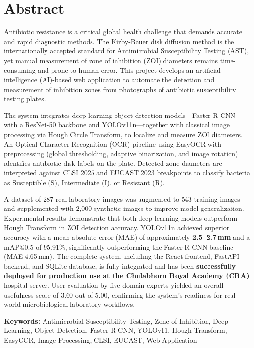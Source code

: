 \chapter*{Abstract}

Antibiotic resistance is a critical global health challenge that demands accurate and rapid diagnostic methods.
The Kirby-Bauer disk diffusion method is the internationally accepted standard for Antimicrobial Susceptibility Testing (AST),
yet manual measurement of zone of inhibition (ZOI) diameters remains time-consuming and prone to human error.
This project develops an artificial intelligence (AI)-based web application to automate the detection
and measurement of inhibition zones from photographs of antibiotic susceptibility testing plates.

The system integrates deep learning object detection models---Faster R-CNN with a ResNet-50 backbone and
YOLOv11n---together with classical image processing via Hough Circle Transform, to localize and measure ZOI diameters.
An Optical Character Recognition (OCR) pipeline using EasyOCR with preprocessing (global thresholding,
adaptive binarization, and image rotation) identifies antibiotic disk labels on the plate.
Detected zone diameters are interpreted against CLSI 2025 and EUCAST 2023 breakpoints
to classify bacteria as Susceptible (S), Intermediate (I), or Resistant (R).

A dataset of 287 real laboratory images was augmented to 543 training images and supplemented with 2,000 synthetic images
to improve model generalization.
Experimental results demonstrate that both deep learning models outperform Hough Transform in ZOI detection accuracy. YOLOv11n achieved superior accuracy with a mean absolute error (MAE) of approximately \textbf{2.5--2.7\,mm} and a mAP@0.5 of 95.91\%, significantly outperforming the Faster R-CNN baseline (MAE 4.65\,mm).
The complete system, including the React frontend, FastAPI backend, and SQLite database, is fully integrated and has been \textbf{successfully deployed for production use at the Chulabhorn Royal Academy (CRA)} hospital server.
User evaluation by five domain experts yielded an overall usefulness score of 3.60 out of 5.00, confirming the system's readiness for real-world microbiological laboratory workflows.

\noindent\textbf{Keywords:} Antimicrobial Susceptibility Testing, Zone of Inhibition, Deep Learning, Object Detection,
Faster R-CNN, YOLOv11, Hough Transform, EasyOCR, Image Processing, CLSI, EUCAST, Web Application

